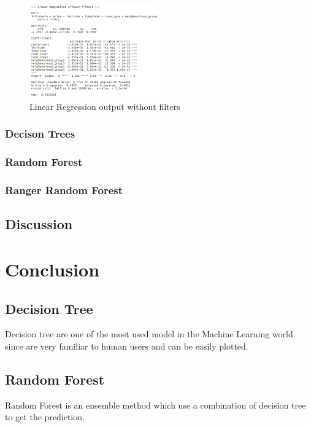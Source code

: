 \documentclass{FR16}
\begin{document}
\begin{figure}[H]
\centering
\includegraphics[width=0.5\textwidth]{figures/lm1.PNG} 
\caption{\label{fig:5} Linear Regression output without filters }
\end{figure}
\subsubsection{Decison Trees}

\subsubsection{Random Forest}

\subsubsection{Ranger Random Forest}


\subsection{Discussion}

\section{Conclusion}




\subsection{Decision Tree}
Decision  tree are one of the most used model in the Machine Learning world since are very familiar to human users and can be easily plotted. 
\\



\subsection{Random Forest}
Random Forest is an ensemble method which use a combination of decision tree to get the prediction.
\end{document}
